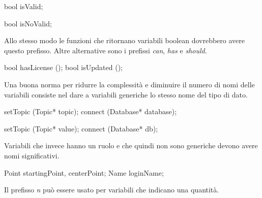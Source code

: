 \begin{minipage}[t]{\cbwidth}
\begin{RightCode}
bool isValid;
\end{RightCode}
\end{minipage}%
\hspace{\cbdistance}
\begin{minipage}[t]{\cbwidth}
\begin{ErrorCode}
bool isNoValid;
\end{ErrorCode}
\end{minipage}

Allo stesso modo le funzioni che ritornano variabili boolean dovrebbero avere questo prefisso.
Altre alternative sono i prefissi \emph{can}, \emph{has} e \emph{should}.

\begin{minipage}[t]{\rbwidth}
\begin{RightCode}
bool hasLicense ();
bool isUpdated ();
\end{RightCode}
\end{minipage}

Una buona norma per ridurre la complessità e diminuire il numero di nomi delle variabili consiste nel dare a variabili generiche lo stesso nome del tipo di dato.

\begin{minipage}[t]{\cbwidth}
\begin{RightCode}
setTopic (Topic* topic);
connect (Database* database);
\end{RightCode}
\end{minipage}%
\hspace{\cbdistance}
\begin{minipage}[t]{\cbwidth}
\begin{ErrorCode}
setTopic (Topic* value);
connect (Database* db);
\end{ErrorCode}
\end{minipage}

Variabili che invece hanno un ruolo e che quindi non sono generiche devono avere nomi significativi.

\begin{minipage}[t]{\rbwidth}
\begin{RightCode}
Point startingPoint, centerPoint;
Name loginName;
\end{RightCode}
\end{minipage}%


Il prefisso \emph{n} può essere usato per variabili che indicano una quantità.

